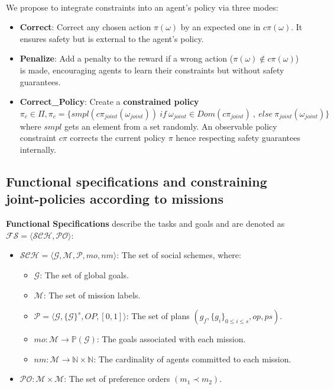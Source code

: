 \documentclass[conference]{IEEEtran}
\begin{document}
%     

\

We propose to integrate constraints into an agent's policy via three modes:

\begin{itemize}
    \item \textbf{Correct}: Correct any chosen action $\pi(\omega)$ by an expected one in $c\pi(\omega)$. It ensures safety but is external to the agent's policy.
    \item \textbf{Penalize}: Add a penalty to the reward if a wrong action ($\pi(\omega) \notin c\pi(\omega)$) is made, encouraging agents to learn their constraints but without safety guarantees.
    \item \textbf{Correct\_Policy}: Create a \textbf{constrained policy} $\pi_c \in \Pi, \pi_c = \{smpl(c\pi_{joint}(\omega_{joint})) \ if \ \omega_{joint} \in Dom(c\pi_{joint}) \ \allowbreak, \ \allowbreak else \ \allowbreak \pi_{joint}(\omega_{joint})\}$ where $smpl$ gets an element from a set randomly. An observable policy constraint $c\pi$ corrects the current policy $\pi$ hence respecting safety guarantees internally.
\end{itemize}


\subsection{Functional specifications and constraining joint-policies according to missions}

\textbf{Functional Specifications} describe the tasks and goals and are denoted as $\mathcal{FS} = \langle \mathcal{SCH}, \mathcal{PO} \rangle$:

\begin{itemize}
    \item $\mathcal{SCH} = \langle \mathcal{G}, \mathcal{M}, \mathcal{P}, mo, nm \rangle$: The set of social schemes, where:
          \begin{itemize}
              \item $\mathcal{G}$: The set of global goals.
              \item $\mathcal{M}$: The set of mission labels.
              \item $\mathcal{P} = \langle \mathcal{G}, \{\mathcal{G}\}^s, OP, [0,1] \rangle$: The set of plans $(g_f, \{g_i\}_{0 \leq i \leq s}, op, ps)$.
              \item $mo: \mathcal{M} \rightarrow \mathbb{P}(\mathcal{G})$: The goals associated with each mission.
              \item $nm: \mathcal{M} \rightarrow \mathbb{N} \times \mathbb{N}$: The cardinality of agents committed to each mission.
          \end{itemize}
    \item $\mathcal{PO}: \mathcal{M} \times \mathcal{M}$: The set of preference orders $(m_1 \prec m_2)$.
\end{itemize}
\end{document}
